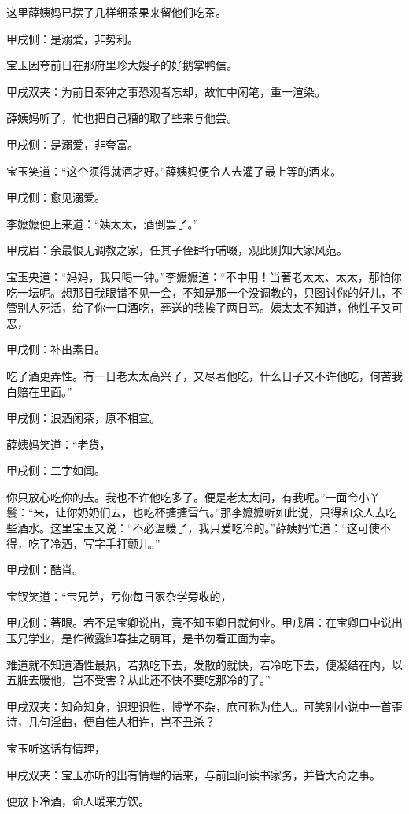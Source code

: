 \begin{parag}
    这里薛姨妈已摆了几样细茶果来留他们吃茶。\begin{note}甲戌侧：是溺爱，非势利。\end{note}宝玉因夸前日在那府里珍大嫂子的好鹅掌鸭信。\begin{note}甲戌双夹：为前日秦钟之事恐观者忘却，故忙中闲笔，重一渲染。\end{note}薛姨妈听了，忙也把自己糟的取了些来与他尝。\begin{note}甲戌侧：是溺爱，非夸富。\end{note}宝玉笑道：“这个须得就酒才好。”薛姨妈便令人去灌了最上等的酒来。\begin{note}甲戌侧：愈见溺爱。\end{note}李嬷嬷便上来道：“姨太太，酒倒罢了。”\begin{note}甲戌眉：余最恨无调教之家，任其子侄肆行哺啜，观此则知大家风范。\end{note}宝玉央道：“妈妈，我只喝一钟。”李嬷嬷道：“不中用！当著老太太、太太，那怕你吃一坛呢。想那日我眼错不见一会，不知是那一个没调教的，只图讨你的好儿，不管别人死活，给了你一口酒吃，葬送的我挨了两日骂。姨太太不知道，他性子又可恶，\begin{note}甲戌侧：补出素日。\end{note}吃了酒更弄性。有一日老太太高兴了，又尽著他吃，什么日子又不许他吃，何苦我白赔在里面。”\begin{note}甲戌侧：浪酒闲茶，原不相宜。\end{note}薛姨妈笑道：“老货，\begin{note}甲戌侧：二字如闻。\end{note}你只放心吃你的去。我也不许他吃多了。便是老太太问，有我呢。”一面令小丫鬟：“来，让你奶奶们去，也吃杯搪搪雪气。”那李嬷嬷听如此说，只得和众人去吃些酒水。这里宝玉又说：“不必温暖了，我只爱吃冷的。”薛姨妈忙道：“这可使不得，吃了冷酒，写字手打颤儿。”\begin{note}甲戌侧：酷肖。\end{note}宝钗笑道：“宝兄弟，亏你每日家杂学旁收的，\begin{note}甲戌侧：著眼。若不是宝卿说出，竟不知玉卿日就何业。甲戌眉：在宝卿口中说出玉兄学业，是作微露卸春挂之萌耳，是书勿看正面为幸。\end{note}难道就不知道酒性最热，若热吃下去，发散的就快，若冷吃下去，便凝结在内，以五脏去暖他，岂不受害？从此还不快不要吃那冷的了。”\begin{note}甲戌双夹：知命知身，识理识性，博学不杂，庶可称为佳人。可笑别小说中一首歪诗，几句淫曲，便自佳人相许，岂不丑杀？\end{note}宝玉听这话有情理，\begin{note}甲戌双夹：宝玉亦听的出有情理的话来，与前回问读书家务，并皆大奇之事。\end{note}便放下冷酒，命人暖来方饮。
\end{parag}



